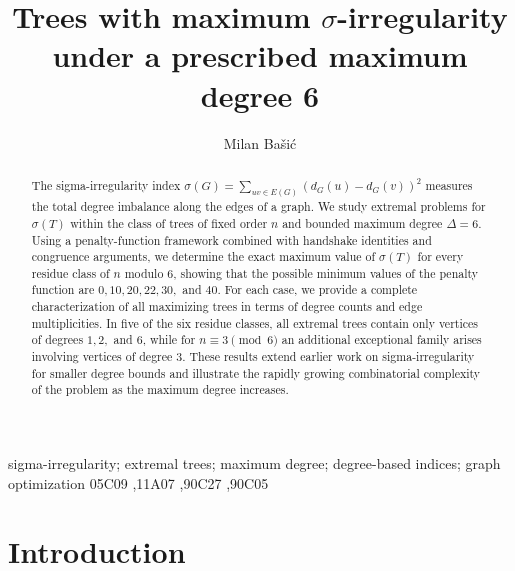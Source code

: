 \documentclass[preprint,12pt]{elsarticle}
\begin{document}
\begin{frontmatter}


\title{Trees with maximum $\sigma$-irregularity under a prescribed maximum degree 6}

\author[address1]{Milan Ba\v si\'c}
\address[address1]{University of Ni\v s, Ni\v s, Serbia}





\begin{abstract}
The sigma-irregularity index $\sigma(G) = \sum_{uv \in E(G)} (d_G(u) - d_G(v))^2$ measures the total degree imbalance along the edges of a graph.
We study extremal problems for $\sigma(T)$ within the class of trees of fixed order $n$ and bounded maximum degree $\Delta = 6$.
Using a penalty-function framework combined with handshake identities and congruence arguments, we determine the exact maximum value of $\sigma(T)$ for every residue class of $n$ modulo $6$, showing that the possible minimum values of the penalty function are $0, 10, 20, 22, 30,$ and $40$.
For each case, we provide a complete characterization of all maximizing trees in terms of degree counts and edge multiplicities. In five of the six residue classes, all extremal trees contain only vertices of degrees $1, 2,$ and $6$, while for $n \equiv 3 \pmod{6}$ an additional exceptional family arises involving vertices of degree $3$. These results extend earlier work on sigma-irregularity for smaller degree bounds and illustrate the rapidly growing combinatorial complexity of the problem as the maximum degree increases.
\end{abstract}



\begin{keyword}
sigma-irregularity; extremal trees; maximum degree; degree-based indices; graph optimization
\MSC 05C09 \sep 11A07 \sep 	90C27 \sep 	90C05
\end{keyword}

\end{frontmatter}







\section{Introduction}
\end{document}
